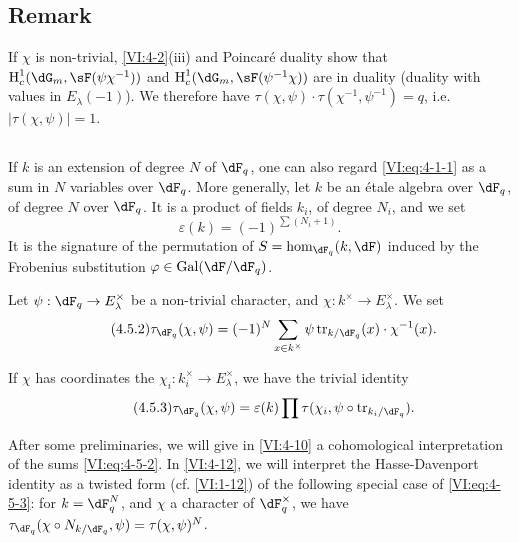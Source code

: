 \subsection{Remark}\label{VI:4-4}

If $\chi$ is non-trivial, \ref{VI:4-2}(iii) and Poincaré duality
show that $\h_c^1(\dG_m,\sF(\psi\chi^{-1}))$ and
$\h_c^1(\dG_m,\sF(\psi^{-1}\chi))$ are in duality (duality with values
in $E_\lambda(-1)$). We therefore have
$\tau(\chi,\psi)\cdot \tau(\chi^{-1},\psi^{-1}) = q$, i.e.
$|\tau(\chi,\psi)|=1$. 





\subsection{}\label{VI:4-5}

If $k$ is an extension of degree $N$ of $\dF_q$, one can also regard
\eqref{VI:eq:4-1-1} as a sum in $N$ variables over $\dF_q$. More
generally, let $k$ be an étale algebra over $\dF_q$, of degree $N$ over
$\dF_q$. It is a product of fields $k_i$, of degree $N_i$, and we set 
\begin{equation*}\tag{4.5.1}\label{VI:eq:4-5-1}
  \varepsilon(k) = (-1)^{\sum (N_i+1)} \text{.} 
\end{equation*}
It is the signature of the permutation of $S=\hom_{\dF_q}(k,\dF)$ induced by the
Frobenius substitution $\varphi\in \gal(\dF/\dF_q)$.

Let $\psi:\dF_q\to E_\lambda^\times$ be a non-trivial character, and
$\chi:k^\times \to E_\lambda^\times$. We set 
\begin{equation*}\tag{4.5.2}\label{VI:eq:4-5-2}
  \tau_{\dF_q}(\chi,\psi) = (-1)^N \sum_{x\in k^\times} \psi \tr_{k/\dF_q}(x) \cdot \chi^{-1}(x) \text{.} 
\end{equation*}

If $\chi$ has coordinates the $\chi_i:k_i^\times \to E_\lambda^\times$, we
have the trivial identity 
\begin{equation*}\tag{4.5.3}\label{VI:eq:4-5-3}
  \tau_{\dF_q}(\chi,\psi) = \varepsilon(k) \prod \tau(\chi_i,\psi\circ \tr_{k_i/\dF_q}) \text{.}
\end{equation*}

After some preliminaries, we will give in \ref{VI:4-10} a
cohomological interpretation of the sums \eqref{VI:eq:4-5-2}. In
\ref{VI:4-12}, we will interpret the Hasse-Davenport identity as a
twisted form (cf. \ref{VI:1-12}) of the following special case of
\eqref{VI:eq:4-5-3}: for $k=\dF_q^N$, and $\chi$ a character of
$\dF_q^\times$, we have
$\tau_{\dF_q}(\chi\circ N_{k/\dF_q},\psi)=\tau(\chi,\psi)^N$. 





